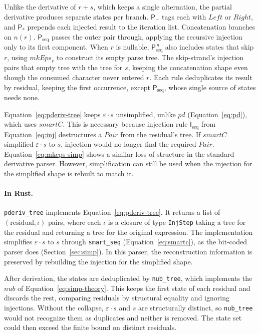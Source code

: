 Unlike the derivative of $r+s$, which keeps a single alternation,
the partial derivative produces separate states per branch.
$\mathsf{P}_{+}$ tags each with $\mathit{Left}$ or $\mathit{Right}$,
and $\mathsf{P}_{*}$ prepends each injected result to the iteration list.
Concatenation branches on $n(r)$.
$\mathsf{P}_{\mathrm{seq}}$ passes the outer pair through,
applying the recursive injection only to its first component.
When $r$ is nullable, $\mathsf{P}_{\mathrm{seq}}^{\,n}$
also includes states that skip $r$,
using $\mathit{mkEps}_r$ to construct its empty parse tree.
The skip-strand's injection pairs that empty tree with the tree for $s$,
keeping the concatenation shape even though the consumed character never entered $r$.
Each rule deduplicates its result by residual, keeping the first occurrence,
except $\mathsf{P}_{\mathrm{seq}}$, whose single source of states needs none.

Equation~\eqref{eq:pderiv-tree} keeps $\varepsilon \cdot s$ unsimplified,
unlike $pd$ (Equation~\eqref{eq:pd}), which uses $\mathit{smartC}$.
This is necessary because injection rule $\mathsf{I}_{\mathrm{seq}}$
from Equation~\eqref{eq:inj} destructures a $\mathit{Pair}$ 
from the residual's tree. 
If $\mathit{smartC}$ simplified $\varepsilon \cdot s$ to $s$, 
injection would no longer find the required $\mathit{Pair}$. 
Equation~\eqref{eq:mkeps-simp} shows a similar loss of structure 
in the standard derivative parser.
However, simplification can still be used when the injection
for the simplified shape is rebuilt to match it.

%

\paragraph{In Rust.}
\label{sec:pderiv-tree-impl}

\texttt{pderiv\_tree} implements Equation~\eqref{eq:pderiv-tree}.
It returns a list of $(\text{residual}, \iota)$ pairs,
where each $\iota$ is a closure of type \texttt{InjStep}
taking a tree for the residual and returning a tree for the original expression.
The implementation simplifies $\varepsilon \cdot s$ to $s$ 
through \texttt{smart\_seq} (Equation~\eqref{eq:smartc}), 
as the bit-coded parser does (Section~\ref{sec:simp}).
In this parser, the reconstruction information
is preserved by rebuilding the injection for the simplified shape.

After derivation, the states are deduplicated by \texttt{nub\_tree}, 
which implements the $\mathit{nub}$ of Equation~\eqref{eq:simp-theory}.
This keeps the first state of each residual and discards the rest, 
comparing residuals by structural equality and ignoring injections. 
Without the collapse, 
$\varepsilon \cdot s$ and $s$ are structurally distinct, 
so \texttt{nub\_tree} would not recognize them as duplicates and neither is removed. 
The state set could then exceed the finite bound on distinct residuals.

